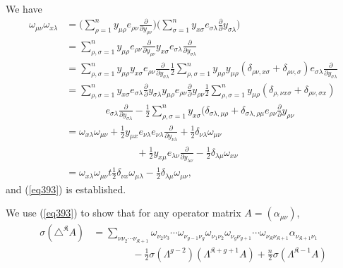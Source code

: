 We have
\begin{align*}
\omega_{\mu \nu } \omega_{x \lambda} & = \big( \sum^n_{\rho = 1}
y_{\mu \rho} e_{\rho \nu} \frac{\partial}{\partial y_{\rho \nu}} \big
) \big( \sum^n_{\sigma = 1} y_{x \sigma} e_{\sigma \lambda}
\frac{\partial}{\partial } y_{\sigma \lambda} \big) \\
& = \sum^{n}_{\rho, \sigma = 1} y_{\mu \rho} e_{\rho \nu}
\frac{\partial}{\partial y_{\rho \nu}} y_{x \sigma} e_{\sigma \lambda}
\frac{\partial}{\partial y _{\sigma \lambda}}\\ 
& = \sum^n_{\rho, \sigma = 1} y_{\mu \rho} y_{x \sigma} e_{\rho \nu}
\frac{\partial}{\partial y_{\sigma \lambda}} \frac{1}{2}
\sum^{n}_{\rho, \sigma = 1} y_{\mu \rho} y_{\mu \rho} (\delta_{\rho
  \nu, x \sigma} + \delta_{\rho \nu, \sigma}) e_{\sigma \lambda}
\frac{\partial}{\partial y_{\sigma \lambda}}\\ 
& = \sum^n_{\rho, \sigma = 1} y_{x \sigma} e_{\sigma \lambda}
\frac{\partial}{\partial} y_{\sigma \lambda} y_{\mu \rho} e_{\rho \nu}
\frac{\partial}{\partial} y_{\rho \nu} \frac{1}{2} \sum^{n}_{\rho,
  \sigma = 1} y_{\mu \rho} (\delta_{\rho, \nu x \sigma} + \delta_{\rho
  \nu, \sigma x}) \\
& \qquad \qquad e_{\sigma \lambda} \frac{\partial}{\partial
  y_{\sigma \lambda}} - \frac{1}{2} \sum^{n}_{\rho, \sigma = 1} y_{x
  \sigma} (\delta_{\sigma \lambda, \mu \rho }+ \delta_{\sigma \lambda,
  \rho \mu} e_{\rho \nu } \frac{\partial}{\partial} y _{\rho \nu} \\ 
& = \omega_{x \lambda} \omega_{\mu \nu} + \frac{1}{2} y_{\mu x} e_{\nu
  \lambda} e_{\nu \lambda} \frac{\partial}{\partial y_{\nu \lambda}} +
\frac{1}{2} \delta_{\nu \lambda} \omega_{\mu \nu } \\
& \hspace{3cm} + \frac{1}{2} y_{x
  \mu} e_{\lambda \nu} \frac{\partial}{\partial y_{\lambda \nu}} -
\frac{1}{2} \delta_{\lambda \mu} \omega_{x \nu}\\ 
& = \omega_{x \lambda} \omega _{\mu \nu} t \frac{1}{2} \delta_{\nu x}
\omega_{\mu \lambda} - \frac{1}{2} \delta_{\lambda \mu} \omega_{\mu
  \nu}, 
\end{align*}\pageoriginale
and (\ref{eq393}) is established.

We use (\ref{eq393}) to show that for any operator matrix  $A =
(\alpha_{\mu \nu})$, 
\begin{align*}
\sigma (\triangle^\mathfrak{K} A) & = \sum_{\nu \nu_2 \cdots
  \nu_{\mathfrak{K}+1}} \omega_{\nu_2 \nu_3} \cdots \omega_{\nu_{g - 1}
  \nu_g} \omega_{\nu_1 \nu_2} \omega_{\nu_g \nu_{g+1}} \cdots
\omega_{\nu_\mathfrak{K}\nu_{\mathfrak{K}+1}}
\alpha_{\nu_{\mathfrak{K}+1} \nu_1}\\ 
& \qquad \qquad - \frac{1}{2} \sigma (\Lambda^{g-2})
(\Lambda^{\mathfrak{K}+g+1} A) + \frac{n }{2} \sigma
(\Lambda^{\mathfrak{K}-1}A) \tag{394}\label{eq394}  
\end{align*}

